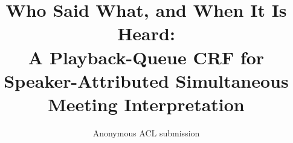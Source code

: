 \documentclass[11pt]{article}
\title{Who Said What, and When It Is Heard:\\
A Playback-Queue CRF for Speaker-Attributed Simultaneous Meeting Interpretation}
\author{Anonymous ACL submission}
\begin{document}
\maketitle











\appendix
\makeatletter
\renewcommand{\thesection}{\ifnum\c@section>26 A\@Alph{\numexpr\c@section-26\relax}\else\@Alph{\c@section}\fi}
\makeatother

\end{document}
